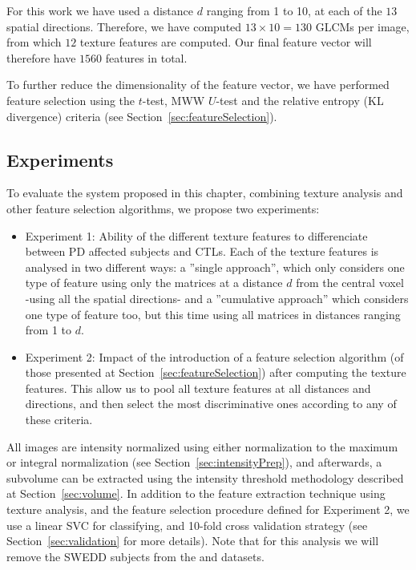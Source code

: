 For this work we have used a distance $d$ ranging from 1 to 10, at each of the $13$ spatial directions. Therefore, we have computed $13\times10=130$ \acp{GLCM} per image, from which $12$ texture features are computed. Our final feature vector will therefore have $1560$ features in total. 

To further reduce the dimensionality of the feature vector, we have performed feature selection using the $t$-test, \ac{MWW} $U$-test and the relative entropy (\ac{KL} divergence) criteria (see Section~\ref{sec:featureSelection}). 

\subsection{Experiments}
To evaluate the system proposed in this chapter, combining texture analysis and other feature selection algorithms, we propose two experiments: 
\begin{itemize}
	\item Experiment 1: Ability of the different texture features to differenciate between \ac{PD} affected subjects and \acp{CTL}. Each of the texture features is analysed in two different ways: a ''single approach'', which only considers one type of feature using only the matrices at a distance $d$ from the central voxel -using all the spatial directions- and a ''cumulative approach'' which considers one type of feature too, but this time using all matrices in distances ranging from 1 to $d$. 
	\item Experiment 2: Impact of the introduction of a feature selection algorithm (of those presented at Section~\ref{sec:featureSelection}) after computing the texture features. This allow us to pool all texture features at all distances and directions, and then select the most discriminative ones according to any of these criteria.  
\end{itemize}

All images are intensity normalized using either normalization to the maximum or integral normalization (see Section~\ref{sec:intensityPrep}), and afterwards, a subvolume can be extracted using the intensity threshold methodology described at Section~\ref{sec:volume}. In addition to the feature extraction technique using texture analysis, and the feature selection procedure defined for Experiment 2, we use a linear \ac{SVC} for classifying, and 10-fold cross validation strategy (see Section~\ref{sec:validation} for more details). Note that for this analysis we will remove the \ac{SWEDD} subjects from the \ppmidat{} and \vdlndat{} datasets. 

